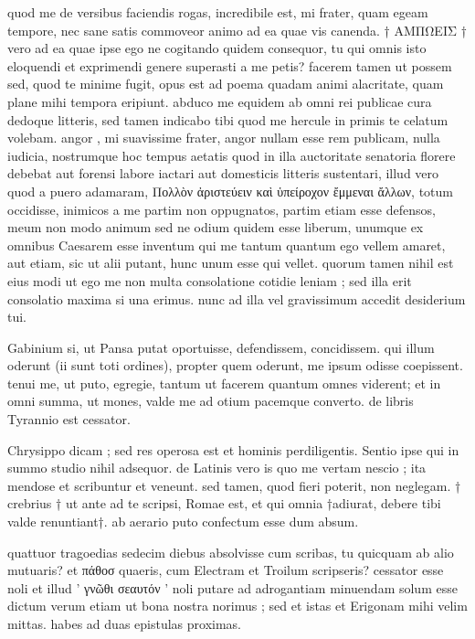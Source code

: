  quod me de versibus faciendis rogas, incredibile est, mi frater, quam egeam tempore, nec sane satis commoveor animo ad ea quae vis canenda. † ΑΜΠΩΕΙΣ † vero ad ea quae ipse ego ne cogitando quidem consequor, tu qui omnis isto eloquendi et exprimendi genere superasti a me petis? facerem tamen ut possem sed, quod te minime fugit, opus est ad poema quadam animi alacritate, quam plane mihi tempora eripiunt. abduco me equidem ab omni rei publicae cura dedoque litteris, sed tamen indicabo tibi quod me hercule in primis te celatum volebam. angor , mi suavissime frater, angor nullam esse rem publicam, nulla iudicia, nostrumque hoc tempus aetatis quod in illa auctoritate senatoria florere debebat aut forensi labore iactari aut domesticis litteris sustentari, illud vero quod a puero adamaram, Πολλὸν ἀριστεύειν καὶ ὑπείροχον ἔμμεναι ἄλλων, totum occidisse, inimicos a me partim non oppugnatos, partim etiam esse defensos, meum non modo animum sed ne odium quidem esse liberum, unumque ex omnibus Caesarem esse inventum qui me tantum quantum ego vellem amaret, aut etiam, sic ut alii putant, hunc unum esse qui vellet. quorum tamen nihil est eius modi ut ego me non multa consolatione cotidie leniam ; sed illa erit consolatio maxima si una erimus. nunc ad illa vel gravissimum accedit desiderium tui.

 Gabinium si, ut Pansa putat oportuisse, defendissem, concidissem. qui illum oderunt (ii sunt toti ordines), propter quem oderunt, me ipsum odisse coepissent. tenui me, ut puto, egregie, tantum ut facerem quantum omnes viderent; et in omni summa, ut mones, valde me ad otium pacemque converto. de libris Tyrannio est cessator.

 Chrysippo dicam ; sed res operosa est et hominis perdiligentis. Sentio ipse qui in summo studio nihil adsequor. de Latinis vero is quo me vertam nescio ; ita mendose et scribuntur et veneunt. sed tamen, quod fieri poterit, non neglegam. † crebrius † ut ante ad te scripsi, Romae est, et qui omnia †adiurat, debere tibi valde renuntiant†. ab aerario puto confectum esse dum absum.

 quattuor tragoedias sedecim diebus absolvisse cum scribas, tu quicquam ab alio mutuaris? et πάθοσ quaeris, cum Electram et Troilum scripseris? cessator esse noli et illud ' γνῶθι σεαυτόν ' noli putare ad adrogantiam minuendam solum esse dictum verum etiam ut bona nostra norimus ; sed et istas et Erigonam mihi velim mittas. habes ad duas epistulas proximas.

